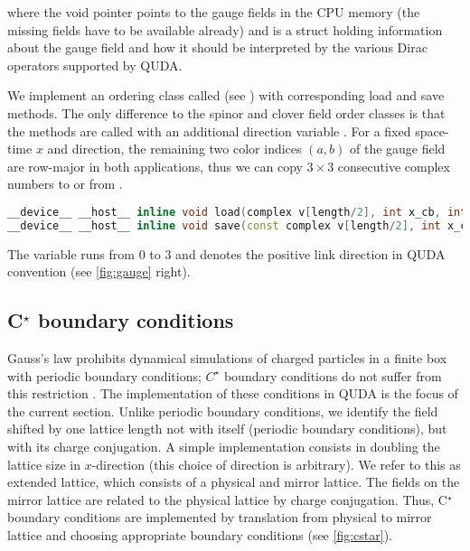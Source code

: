 where the void pointer  points to the gauge fields in the CPU memory (the missing fields have to be available already) and  is a struct holding information about the gauge field and how it should be interpreted by the various Dirac operators supported by QUDA.

We implement an ordering class called  (see  \cite{QUDApaper}) with corresponding load and save methods. The only difference to the spinor and clover field order classes is that the methods are called with an additional direction variable . For a fixed space-time $x$ and direction, the remaining two color indices $(a,b)$ of the gauge field are row-major in both applications, thus we can copy $3\times 3$ consecutive complex numbers to or from .

\begin{lstlisting}[language=C++]
__device__ __host__ inline void load(complex v[length/2], int x_cb, int dir, int parity, Float = 1.0) const
__device__ __host__ inline void save(const complex v[length/2], int x_cb, int dir, int parity) const
\end{lstlisting}

The variable  runs from $0$ to $3$ and denotes the positive link direction in QUDA convention (see \cref{fig:gauge} right).

\subsection{C$^{\star}$ boundary conditions}
\label{sub:cstar}

Gauss's law prohibits dynamical simulations of charged particles in a finite box with periodic boundary conditions; $C^\star$ boundary conditions do not suffer from this restriction \cite{Kronfeld1991}.
The implementation of these conditions in QUDA is the focus of the current section.
Unlike periodic boundary conditions, we identify the field shifted by one lattice length not with itself (periodic boundary conditions), but with
its charge conjugation. A simple implementation consists in doubling the lattice size in $x$-direction (this choice of direction is arbitrary). We refer
 to this as extended lattice, which consists of a physical and mirror lattice. The fields on the mirror lattice 
 are related to the physical lattice by charge conjugation. Thus, C$^\star$ boundary conditions are implemented by translation from
 physical to mirror lattice and choosing appropriate boundary conditions  (see \cref{fig:cstar}).

